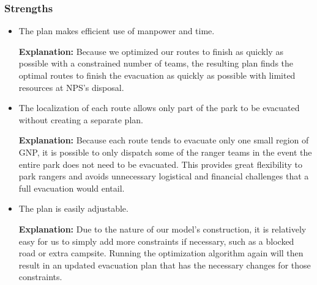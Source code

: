 \documentclass[12pt]{article}
\begin{document}
\subsubsection{Strengths}
\begin{itemize}

    \item The plan makes efficient use of manpower and time.
    
    \textbf{Explanation:} Because we optimized our routes to finish as quickly as possible with a constrained number of teams, the resulting plan finds the optimal routes to finish the evacuation as quickly as possible with limited resources at NPS's disposal.

    \item The localization of each route allows only part of the park to be evacuated without creating a separate plan.
    
    \textbf{Explanation:} Because each route tends to evacuate only one small region of GNP, it is possible to only dispatch some of the ranger teams in the event the entire park does not need to be evacuated. This provides great flexibility to park rangers and avoids unnecessary logistical and financial challenges that a full evacuation would entail.
    
    \item The plan is easily adjustable.
    
    \textbf{Explanation:} Due to the nature of our model's construction, it is relatively easy for us to simply add more constraints if necessary, such as a blocked road or extra campsite. Running the optimization algorithm again will then result in an updated evacuation plan that has the necessary changes for those constraints.
    
\end{itemize}
\end{document}
